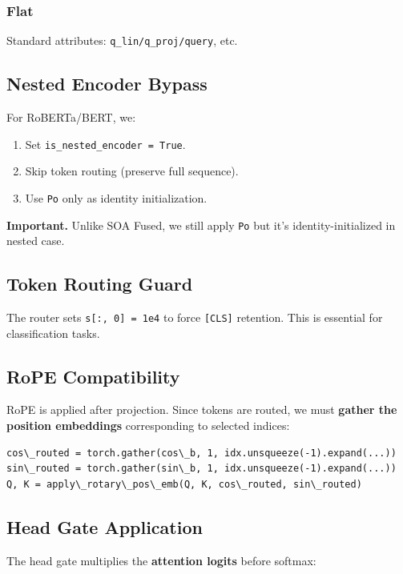 \subsubsection{Flat}

Standard attributes: \texttt{q\_lin/q\_proj/query}, etc.

\subsection{Nested Encoder Bypass}

For RoBERTa/BERT, we:
\begin{enumerate}
\item Set \texttt{is\_nested\_encoder = True}.
\item Skip token routing (preserve full sequence).
\item Use \texttt{Po} only as identity initialization.

\end{enumerate}
\textbf{Important.} Unlike SOA Fused, we still apply \texttt{Po} but it's identity-initialized 
in nested case.

\subsection{Token Routing Guard}

The router sets \texttt{s[:, 0] = 1e4} to force \texttt{[CLS]} retention. This is 
essential for classification tasks.

\subsection{RoPE Compatibility}

RoPE is applied after projection. Since tokens are routed, we must 
\textbf{gather the position embeddings} corresponding to selected indices:

\begin{lstlisting}
cos\_routed = torch.gather(cos\_b, 1, idx.unsqueeze(-1).expand(...))
sin\_routed = torch.gather(sin\_b, 1, idx.unsqueeze(-1).expand(...))
Q, K = apply\_rotary\_pos\_emb(Q, K, cos\_routed, sin\_routed)
\end{lstlisting}

\subsection{Head Gate Application}

The head gate multiplies the \textbf{attention logits} before softmax:


